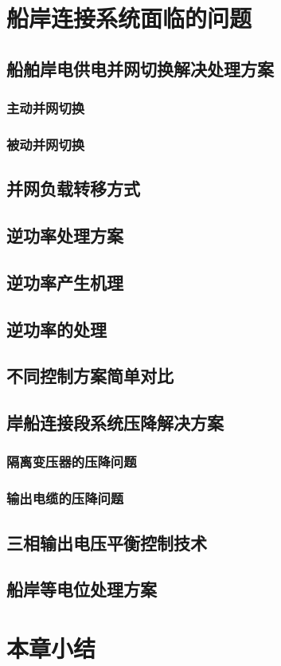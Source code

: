 \section{船岸连接系统面临的问题}
\subsection{船舶岸电供电并网切换解决处理方案}
\subsubsection{主动并网切换}
\subsubsection{被动并网切换}

\subsection{并网负载转移方式}
\subsection{逆功率处理方案}
\subsection{逆功率产生机理}
\subsection{逆功率的处理}
\subsection{不同控制方案简单对比}




\subsection{岸船连接段系统压降解决方案}

\subsubsection{隔离变压器的压降问题}
\subsubsection{输出电缆的压降问题}


\subsection{三相输出电压平衡控制技术}
\subsection{船岸等电位处理方案}


\zhlipsum[5]

\section{本章小结}


\zhlipsum[6]